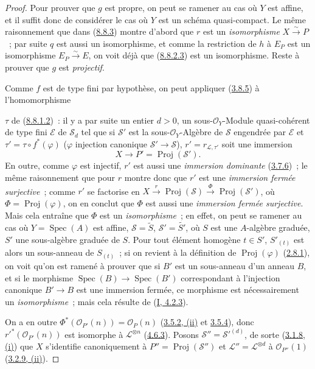\begin{proof}
Pour prouver que $g$ est propre, on peut se ramener au cas où $Y$ est affine,
et il suffit donc de considérer le cas où $Y$ est un schéma quasi-compact. Le
même raisonnement que dans (\hyperref[II.8.8.3-fr]{8.8.3}) montre d'abord que
$r$ est un \emph{isomorphisme} $X\xrightarrow{\sim}P$~; par suite $q$ est aussi
un isomorphisme, et comme la restriction de $h$ à $E_P$ est un isomorphisme
$E_P\xrightarrow{\sim}E$, on voit déjà que
(\hyperref[II.8.8.2.3-fr]{8.8.2.3}) est un isomorphisme. Reste à prouver que
$g$ est \emph{projectif}.

Comme $f$ est de type fini par hypothèse, on peut appliquer
(\hyperref[II.3.8.5-fr]{3.8.5}) à l'homomorphisme

$\tau$ de (\hyperref[II.8.8.1.2-fr]{8.8.1.2})~: il y a par suite un entier
$d>0$, un sous-$\mathcal{O}_Y$-Module quasi-cohérent de type fini
$\mathcal{E}$ de $\mathcal{S}_d$ tel que si $\mathcal{S}'$ est la
sous-$\mathcal{O}_Y$-Algèbre de $\mathcal{S}$ engendrée par $\mathcal{E}$ et
$\tau'=\tau\circ f^*(\varphi)$ ($\varphi$ injection canonique
$\mathcal{S}'\to\mathcal{S}$), $r'=r_{\mathcal{L},\tau'}$ soit une immersion
\[
  X\longrightarrow P'=\operatorname{Proj}(\mathcal{S}').
\]
En outre, comme $\varphi$ est injectif, $r'$ est aussi une \emph{immersion
dominante} (\hyperref[II.3.7.6-fr]{3.7.6})~; le même raisonnement que pour $r$
montre donc que $r'$ est une \emph{immersion fermée surjective}~; comme $r'$ se
factorise en
$X\xrightarrow{r}\operatorname{Proj}(\mathcal{S})
\xrightarrow{\Phi}\operatorname{Proj}(\mathcal{S}')$, où
$\Phi=\operatorname{Proj}(\varphi)$, on en conclut que $\Phi$ est aussi une
\emph{immersion fermée surjective}. Mais cela entraîne que $\Phi$ est un
\emph{isomorphisme}~; en effet, on peut se ramener au cas où
$Y=\operatorname{Spec}(A)$ est affine, $\mathcal{S}=\widetilde{S}$,
$\mathcal{S}'=\widetilde{S'}$, où $S$ est une $A$-algèbre graduée, $S'$ une
sous-algèbre graduée de $S$. Pour tout élément homogène $t\in S'$,
$S'_{(t)}$ est alors un sous-anneau de $S_{(t)}$~; si on revient à la
définition de $\operatorname{Proj}(\varphi)$
(\hyperref[II.2.8.1-fr]{2.8.1}), on voit qu'on est ramené à prouver que si
$B'$ est un sous-anneau d'un anneau $B$, et si le morphisme
$\operatorname{Spec}(B)\to\operatorname{Spec}(B')$ correspondant à l'injection
canonique $B'\to B$ est une immersion fermée, ce morphisme est nécessairement
un \emph{isomorphisme}~; mais cela résulte de
(\hyperref[I.4.2.3-fr]{I, 4.2.3}).

On a en outre
$\Phi^*(\mathcal{O}_{P'}(n))=\mathcal{O}_P(n)$
(\hyperref[II.3.5.2-fr]{3.5.2, (ii)} et
\hyperref[II.3.5.4-fr]{3.5.4}), donc
$r'^*(\mathcal{O}_{P'}(n))$ est isomorphe à $\mathcal{L}^{\otimes n}$
(\hyperref[II.4.6.3-fr]{4.6.3}). Posons
$\mathcal{S}''=\mathcal{S}'^{(d)}$, de sorte
(\hyperref[II.3.1.8-fr]{3.1.8, (i)}) que $X$ s'identifie canoniquement à
$P''=\operatorname{Proj}(\mathcal{S}'')$ et
$\mathcal{L}''=\mathcal{L}^{\otimes d}$ à $\mathcal{O}_{P''}(1)$
(\hyperref[II.3.2.9-fr]{3.2.9, (ii)}).


\end{proof}
